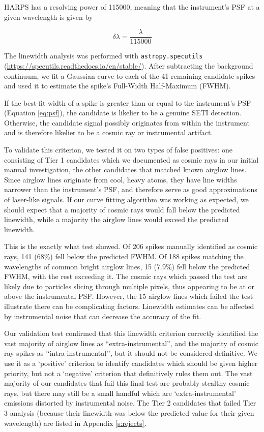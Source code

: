 \documentclass[twocolumn]{aastex701}
\begin{document}
HARPS has a resolving power \citep{HARPS_specs} of 115000, meaning that the instrument's PSF at a given wavelength is given by 

\begin{equation}
    \delta\lambda = \frac{\lambda}{115000}
    \label{eq:psf}
\end{equation}

The linewidth analysis was performed with \texttt{astropy.specutils} (\url{https://specutils.readthedocs.io/en/stable/}). After subtracting the background continuum, we fit a Gaussian curve to each of the 41 remaining candidate spikes and used it to estimate the spike's Full-Width Half-Maximum (FWHM).

If the best-fit width of a spike is greater than or equal to the instrument's PSF (Equation \ref{eq:psf}), the candidate is likelier to be a genuine SETI detection. Otherwise, the candidate signal possibly originates from within the instrument and is therefore likelier to be a cosmic ray or instrumental artifact.

To validate this criterion, we tested it on two types of false positives: one consisting of Tier 1 candidates which we documented as cosmic rays in our initial manual investigation, the other candidates that matched known airglow lines.  Since airglow lines originate from cool, heavy atoms, they have line widths narrower than the instrument's PSF, and therefore serve as good approximations of laser-like  signals.  If our curve fitting algorithm was working as expected, we should expect that a majority of cosmic rays would fall below the predicted linewidth, while a majority the airglow lines would exceed the predicted linewidth.

This is the exactly what test showed.  Of 206 spikes manually identified as cosmic rays, 141 (68\%) fell below the predicted FWHM.  Of 188 spikes matching the wavelengths of common bright airglow lines, 15 (7.9\%) fell below the predicted FWHM, with the rest exceeding it. The cosmic rays which passed the test are likely due to particles slicing through multiple pixels, thus appearing to be at or above the instrumental PSF. However, the 15 airglow lines which failed the test illustrate there can be complicating factors. Linewidth estimates can be affected by instrumental noise that can decrease the accuracy of the fit. 

Our validation test confirmed that this linewidth criterion correctly identified the vast majority of airglow lines as ``extra-instrumental'', and the majority of cosmic ray spikes as '`intra-instrumental'', but it should not be considered definitive.  We use it as a `positive' criterion to identify candidates which should be given higher priority, but not a `negative' criterion that definitively rules them out.  The vast majority of our candidates that fail this final test are probably stealthy cosmic rays, but there may still be a small handful which are `extra-instrumental' emissions distorted by instrumental noise. The Tier 2 candidates that failed Tier 3 analysis (because their linewidth was below the predicted value for their given wavelength) are listed in Appendix \ref{s:rejects}.
\end{document}
